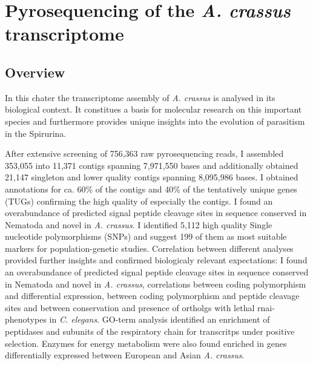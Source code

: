 
\chapter{Pyrosequencing of the \textit{A. crassus}
  transcriptome} %
\label{cha:pyro}



\ifpdf
    \graphicspath{{5_pyro/figures/PNG/}{5_pyro/figures/PDF/}{5_pyro/figures/}}
\else
    \graphicspath{{5_pyro/figures/EPS/}{5_pyro/figures/}}
\fi


\section{Overview}
\label{sec:454-overv}

In this chater the transcriptome assembly of \textit{A. crassus} is
analysed in its biological context. It constitues a basis for
molecular research on this important species and furthermore provides
unique insights into the evolution of parasitism in the Spirurina.

After extensive screening of 756,363 raw pyrosequencing reads, I
assembled 353,055 into 11,371 contigs spanning 7,971,550 bases and
additionally obtained 21,147 singleton and lower quality contigs
spanning 8,095,986 bases. I obtained annotations for ca. 60\% of the
contigs and 40\% of the tentatively unique genes (TUGs) confirming the
high quality of especially the contigs. I found an overabundance of
predicted signal peptide cleavage sites in sequence conserved in
Nematoda and novel in \textit{A. crassus}. I identified 5,112 high
quality Single nucleotide polymorphisms (SNPs) and suggest 199 of them
as most suitable markers for population-genetic studies. Correlation
between different analyses provided further insights and confirmed
biologicaly relevant expectations: I found an overabundance of
predicted signal peptide cleavage sites in sequence conserved in
Nematoda and novel in \textit{A. crassus}, correlations between coding
polymorphism and differential expression, between coding polymorphism
and peptide cleavage sites and between conservation and presence of
ortholgs with lethal rnai-phenotypes in \textit{C. elegans}. GO-term
analysis identified an enrichment of peptidases and subunits of the
respiratory chain for transcritps under positive selection. Enzymes
for energy metabolism were also found enriched in genes differentially
expressed between European and Asian \textit{A. crassus}.

